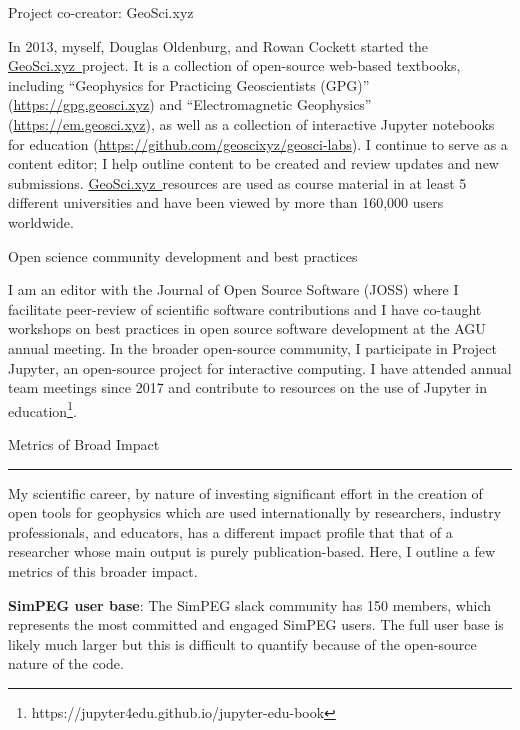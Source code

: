 \documentclass[a4paper, 11pt]{article}
\newcommand{\gpg}{\href{https://gpg.geosci.xyz}{https://gpg.geosci.xyz}}
\newcommand{\emgeosci}{\href{https://em.geosci.xyz}{https://em.geosci.xyz}}
\newcommand{\GeoSci}{\href{https://geosci.xyz}{GeoSci.xyz~}}
\newcommand{\heading}[1]{
    \begin{minipage}[t]{\textwidth}
    \vspace{0.45cm}
    {\LARGE #1}\\
    \vspace{-0.2cm}
    \hrule
    \end{minipage}
    \vspace{0.2cm}

}
\newcommand{\subheading}[1]{
    \vspace{0.4cm}
    {\Large #1}\\
    \vspace{-0.2cm}
}
\begin{document}
\subheading{Project co-creator: GeoSci.xyz}

In 2013, myself, Douglas Oldenburg, and Rowan Cockett started the \GeoSci project. It is a collection of open-source web-based textbooks, including ``Geophysics for Practicing Geoscientists (GPG)'' (\gpg) and ``Electromagnetic Geophysics'' (\emgeosci), as well as a collection of interactive Jupyter notebooks for education (\href{https://github.com/geoscixyz/geosci-labs}{https://github.com/geoscixyz/geosci-labs}). I continue to serve as a content editor; I help outline content to be created and review updates and new submissions. \GeoSci resources are used as course material in at least 5 different universities and have been viewed by more than 160,000 users worldwide.


\subheading{Open science community development and best practices}

I am an editor with the Journal of Open Source Software (JOSS) where I facilitate peer-review of scientific software contributions and I have co-taught workshops on best practices in open source software development at the AGU annual meeting. In the broader open-source community, I participate in Project Jupyter, an open-source project for interactive computing. I have attended annual team meetings since 2017 and contribute to resources on the use of Jupyter in education\footnote{https://jupyter4edu.github.io/jupyter-edu-book}.

\clearpage
\heading{Metrics of Broad Impact}

My scientific career, by nature of investing significant effort in the creation of open tools for geophysics which are used internationally by researchers, industry professionals, and educators, has a different impact profile that that of a researcher whose main output is purely publication-based. Here, I outline a few metrics of this broader impact. \vspace{0.3cm}

\textbf{SimPEG user base}: The SimPEG slack community has 150 members, which represents the most committed and engaged SimPEG users. The full user base is likely much larger but this is difficult to quantify because of the open-source nature of the code. \vspace{0.3cm}

\end{document}
